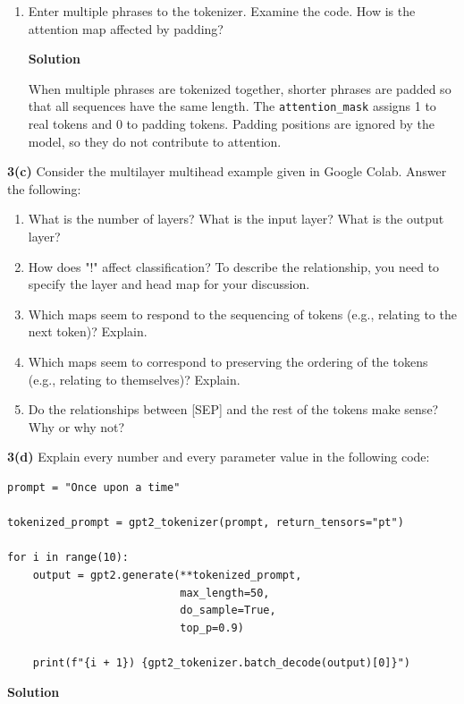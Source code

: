 \documentclass[10pt]{article}
\begin{document}
\begin{enumerate}[label=\roman*.]
    \item Enter multiple phrases to the tokenizer. Examine the code. How is the attention map affected by padding?
    
    \textbf{Solution}
    
    When multiple phrases are tokenized together, shorter phrases are padded so that all sequences have the same length. The \texttt{attention\_mask} assigns 1 to real tokens and 0 to padding tokens. Padding positions are ignored by the model, so they do not contribute to attention.
    
\end{enumerate}

\textbf{3(c)} Consider the multilayer multihead example given in Google Colab. Answer the following:
\begin{enumerate}[label=\roman*.]
    \item What is the number of layers? What is the input layer? What is the output layer?
    \item How does "!" affect classification? To describe the relationship, you need to specify the layer and head map for your discussion.
    \item Which maps seem to respond to the sequencing of tokens (e.g., relating to the next token)? Explain.
    \item Which maps seem to correspond to preserving the ordering of the tokens (e.g., relating to themselves)? Explain.
    \item Do the relationships between [SEP] and the rest of the tokens make sense? Why or why not?
\end{enumerate}

\textbf{3(d)} Explain every number and every parameter value in the following code:

\begin{lstlisting}
prompt = "Once upon a time"

tokenized_prompt = gpt2_tokenizer(prompt, return_tensors="pt")

for i in range(10):
    output = gpt2.generate(**tokenized_prompt,
                           max_length=50,
                           do_sample=True,
                           top_p=0.9)

    print(f"{i + 1}) {gpt2_tokenizer.batch_decode(output)[0]}")
\end{lstlisting}

\textbf{Solution}
\end{document}
